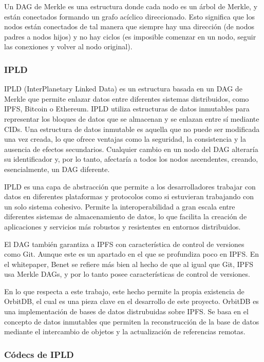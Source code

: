 Un DAG de Merkle es una estructura donde cada nodo es un árbol de Merkle, y están conectados formando un grafo acíclico direccionado.
Esto significa que los nodos están conectados de tal manera que siempre hay una dirección (de nodos padres a nodos hijos) y no hay ciclos (es imposible comenzar en un nodo, seguir las conexiones y volver al nodo original).



\subsubsection{IPLD}
IPLD (InterPlanetary Linked Data)\cite{IPLDDocs} es un estructura basada en un DAG de Merkle que permite enlazar datos entre diferentes sistemas
distribuidos, como IPFS, Bitcoin o Ethereum. IPLD utiliza estructuras de datos inmutables para representar los
bloques de datos que se almacenan y se enlazan entre sí mediante CIDs. Una estructura de datos inmutable es aquella que no puede ser modificada una vez creada, lo que ofrece
ventajas como la seguridad, la consistencia y la ausencia de efectos secundarios. Cualquier cambio en un nodo del DAG alteraría su identificador y, por lo tanto, afectaría a todos los nodos ascendentes, creando, esencialmente, un DAG diferente.

IPLD es una capa de abstracción que permite a los desarrolladores trabajar con datos en diferentes plataformas y protocolos como si estuvieran trabajando con un solo sistema cohesivo. Permite la interoperabilidad a gran escala entre diferentes sistemas de almacenamiento de datos, lo que facilita la creación de aplicaciones y servicios más robustos y resistentes en entornos distribuidos.

El DAG también garantiza a IPFS con característica de control de versiones como Git. Aunque este es un apartado en el que se profundiza poco en IPFS.
En el whitepaper, Benet se refiere más bien al hecho de que al igual que Git, IPFS usa Merkle DAGs, y por lo tanto posee características de
control de versiones.

En lo que respecta a este trabajo, este hecho permite la propia existencia de OrbitDB, el cual es una pieza clave en el desarrollo de este proyecto. OrbitDB es una implementación de bases de datos distrubuidas sobre IPFS. Se basa en el concepto de datos inmutables que permiten la reconstrucción de la base de datos mediante el intercambio de objetos y la actualización de referencias remotas.

\subsubsection{Códecs de IPLD}

